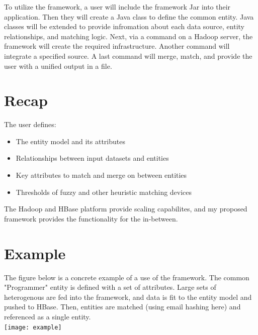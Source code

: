 \documentclass[12pt]{article}
\begin{document}
To utilize the framework, a user will include the framework Jar into their application. Then they will create a Java class to define the common entity. Java classes will be extended to provide infromation about each data source, entity relationships, and matching logic. Next, via a command on a Hadoop server, the framework will create the required infrastructure. Another command will integrate a specified source. A last command will merge, match, and provide the user with a unified output in a file.

\section{Recap}
The user defines:
\begin{itemize}
    \item The entity model and its attributes
    \item Relationships between input datasets and entities
    \item Key attributes to match and merge on between entities
    \item Thresholds of fuzzy and other heuristic matching devices
\end{itemize}

The Hadoop and HBase platform provide scaling capabilites, and my proposed framework provides the functionality for the in-between.

\section{Example}
The figure below is a concrete example of a use of the framework. The common "Programmer" entity is defined with a set of attributes. Large sets of heterogenous are fed into the framework, and data is fit to the entity model and pushed to HBase. Then, entities are matched (using email hashing here) and referenced as a single entity.\\
\texttt{[image: example]}
\end{document}
